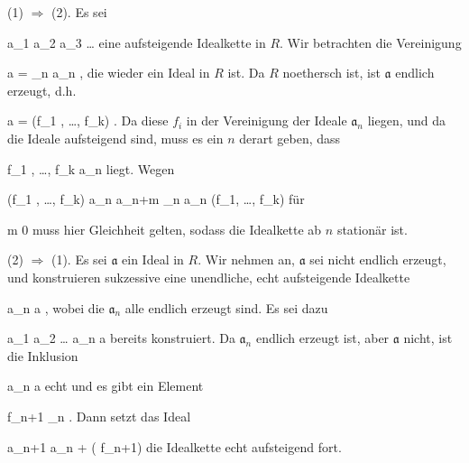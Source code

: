 {




(1) $\Rightarrow$ (2). Es sei

\mavergleichskettedisp
{\vergleichskette
{ {\mathfrak a}_1
}
{ \subseteq} { {\mathfrak a}_2
}
{ \subseteq} { {\mathfrak a}_3
}
{ \subseteq} { \ldots
}
{ } {
}
}
{}{}{}
eine aufsteigende Idealkette in $R$. Wir betrachten die Vereinigung

\mavergleichskettedisp
{\vergleichskette
{ {\mathfrak a}
}
{ =} { \bigcup_{n \in \N } {\mathfrak a}_n
}
{ } {
}
{ } {
}
{ } {
}
}
{}{}{,}
die wieder ein Ideal in $R$ ist. Da $R$ noethersch ist, ist ${\mathfrak a}$ endlich erzeugt, d.h.

\mavergleichskette
{\vergleichskette
{ {\mathfrak a}
}
{ = }{ (f_1 , \ldots , f_k)
}
{  }{
}
{    }{
}
{   }{
}
}
{}{}{.}
Da diese $f_i$ in der Vereinigung der Ideale ${\mathfrak a}_n$ liegen, und da die Ideale aufsteigend sind, muss es ein $n$ derart geben, dass

\mavergleichskette
{\vergleichskette
{ f_1 , \ldots , f_k
}
{ \in }{ {\mathfrak a}_n
}
{  }{
}
{    }{
}
{   }{
}
}
{}{}{}
liegt. Wegen

\mavergleichskettedisp
{\vergleichskette
{ (f_1 , \ldots ,  f_k)
}
{ \subseteq} { {\mathfrak a}_n
}
{ \subseteq} { {\mathfrak a}_{n+m}
}
{ \subseteq} { \bigcup_{n \in \N } {\mathfrak a}_n
}
{ \subseteq} { (f_1, \ldots , f_k)
}
}
{}{}{}
für

\mavergleichskette
{\vergleichskette
{ m
}
{ \geq }{ 0
}
{  }{
}
{    }{
}
{   }{
}
}
{}{}{}
muss hier Gleichheit gelten, sodass die Idealkette ab $n$ stationär ist.


(2) $\Rightarrow$ (1). Es sei ${\mathfrak a}$ ein Ideal in $R$. Wir nehmen an, ${\mathfrak a}$ sei nicht endlich erzeugt, und konstruieren sukzessive eine unendliche, echt aufsteigende Idealkette

\mavergleichskette
{\vergleichskette
{ {\mathfrak a}_n
}
{ \subset }{ {\mathfrak a}
}
{  }{
}
{    }{
}
{   }{
}
}
{}{}{,}
wobei die ${\mathfrak a}_n$ alle endlich erzeugt sind. Es sei dazu

\mavergleichskettedisp
{\vergleichskette
{ {\mathfrak a}_1
}
{ \subset} { {\mathfrak a}_2
}
{ \subset} { \ldots
}
{ \subset} { {\mathfrak a}_n
}
{ \subseteq} { {\mathfrak a}
}
}
{}{}{}
bereits konstruiert. Da ${\mathfrak a}_n$ endlich erzeugt ist, aber ${\mathfrak a}$ nicht, ist die Inklusion

\mavergleichskette
{\vergleichskette
{ {\mathfrak a}_n
}
{ \subseteq }{ {\mathfrak a}
}
{  }{
}
{    }{
}
{   }{
}
}
{}{}{}
echt und es gibt ein Element

 {}
 {f_{n+1} \not{}_{n}} {}
 {} {} {} {.}
Dann setzt das Ideal

\mavergleichskette
{\vergleichskette
{ {\mathfrak a}_{n+1}
}
{  }{ {\mathfrak a}_n + ( f_{n+1})
}
{  }{
}
{    }{
}
{   }{
}
}
{}{}{}
die Idealkette echt aufsteigend fort.




}








